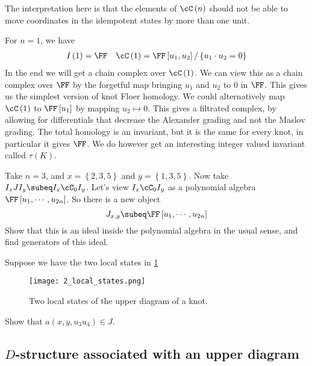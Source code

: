 \documentclass{amsproc}
\begin{document}
The interpretation here 
is that the elements of $\cC\left( n \right)$ should not be able
to move coordinates in the idempotent states by more than one unit.

\begin{exm}
For $n = 1$, we have
\begin{align}
I\left( 1 \right) = \FF&&
\cC\left( 1 \right) = \FF\left[ u_1 , u_2 \right] /
\left\{ u_1 \cdot u_2 = 0 \right\}
\end{align}
In the end we will get a chain complex over $\cC\left( 1 \right)$.
We can view this as a chain complex over $\FF$ by the forgetful map
bringing $u_1$ and $u_2$ to $0$ in $\FF$.
This gives us the simplest version of knot Floer homology. 
We could alternatively map $\cC\left( 1 \right)$ to $\FF\left[ u_1 \right]$ by mapping $u_2 \mapsto 0$.
This gives a filtrated complex, 
by allowing for differentials that decrease the Alexander grading
and not the Maslov grading. The total homology is an invariant, 
but it is the same for every knot, 
in particular it gives $\FF$.
We do however get an interesting integer valued invariant called $\tau\left( K \right)$.
\end{exm}

\begin{exr}
Take $n = 3$, and $x = \left\{ 2,3,5 \right\}$ and $y = \left\{ 1,3,5 \right\}$. 
Now take $I_x J I_y \subeq I_x \cC_0 I_y$.
Let's view $I_x \cC_0 I_y$ as a polynomial algebra $\FF\left[ u_1 , \cdots , u_{2n} \right]$. 
So there is a new object
\begin{equation}
J_{x,y} \subeq \FF \left[ u_1 , \cdots , u_{2n} \right]
\end{equation}
Show that this is an ideal inside the polynomial algebra in the usual sense, 
and find generators of this ideal.
\end{exr}

\begin{exr}
Suppose we have the two local states in \cref{fig:exr_states}
\begin{figure}
\texttt{[image: 2\_local\_states.png]}
\caption{Two local states of the upper diagram of a knot.}
\label{fig:exr_states}
\end{figure}
Show that $a\left( x , y , u_3u_4 \right) \in J$.
\end{exr}

\subsection{$D$-structure associated with an upper diagram}
\end{document}
